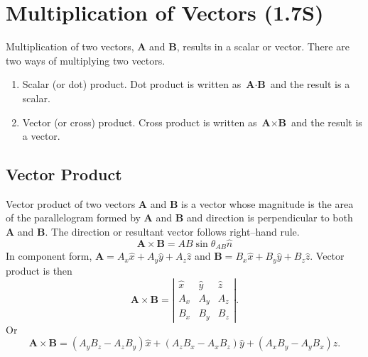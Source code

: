 \documentclass[12pt,a4paper]{article}
\begin{document}
\section{Multiplication of Vectors (1.7S)}
Multiplication of two vectors, \textbf{A} and \textbf{B}, results in a scalar or vector. There are two ways of multiplying two vectors.
\begin{enumerate}
\item Scalar (or dot) product. Dot product is written as $\textbf{A}\cdot \textbf{B}$ and the result is a scalar.
\item Vector (or cross) product. Cross product is written as $\textbf{A}\times \textbf{B}$ and the result is a vector.
\end{enumerate}
\subsection{Vector Product}
Vector product of two vectors \textbf{A} and \textbf{B} is a vector whose magnitude is the area of the parallelogram formed by \textbf{A} and \textbf{B} and direction is perpendicular to both \textbf{A} and \textbf{B}. The direction or resultant vector follows right--hand rule.
\begin{equation}
\textbf{A}\times \textbf{B}=AB\sin\theta_{AB}\hat n
\end{equation}
In component form, $\textbf{A}=A_x\hat x+A_y\hat y+A_z\hat z$ and $\textbf{B}=B_x\hat x+B_y\hat y+B_z\hat z$. Vector product is then
\begin{equation}
\textbf{A}\times \textbf{B}=\left| \begin{array}{ccc} \hat{x} & \hat{y} & \hat{z} \\ A_x & A_y & A_z\\ B_x & B_y & B_z \end{array} \right|.
\end{equation}
Or
\begin{equation}
\textbf{A}\times \textbf{B}=(A_yB_z-A_zB_y)\hat x+(A_zB_x-A_xB_z)\hat y+(A_xB_y-A_yB_x)\hat z.
\end{equation}
\end{document}
